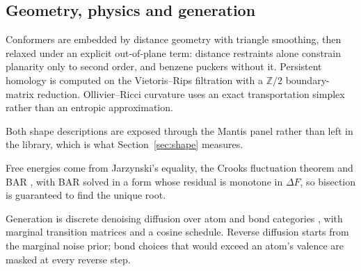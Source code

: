 \subsection{Geometry, physics and generation}

Conformers are embedded by distance geometry with triangle smoothing, then relaxed
under an explicit out-of-plane term: distance restraints alone constrain planarity
only to second order, and benzene puckers without it. Persistent homology is computed
on the Vietoris--Rips filtration with a $\mathbb{Z}/2$ boundary-matrix reduction.
Ollivier--Ricci curvature \cite{ollivier2009ricci} uses an exact transportation
simplex rather than an entropic approximation.

Both shape descriptions are exposed through the Mantis panel rather than left
in the library, which is what Section~\ref{sec:shape} measures.

Free energies come from Jarzynski's equality, the Crooks fluctuation theorem and BAR
\cite{jarzynski1997nonequilibrium,crooks1999entropy,bennett1976efficient}, with BAR
solved in a form whose residual is monotone in $\Delta F$, so bisection is guaranteed
to find the unique root.

Generation is discrete denoising diffusion over atom and bond categories
\cite{austin2021structured,vignac2023digress}, with marginal transition matrices and
a cosine schedule. Reverse diffusion starts from the marginal noise prior; bond
choices that would exceed an atom's valence are masked at every reverse step.
